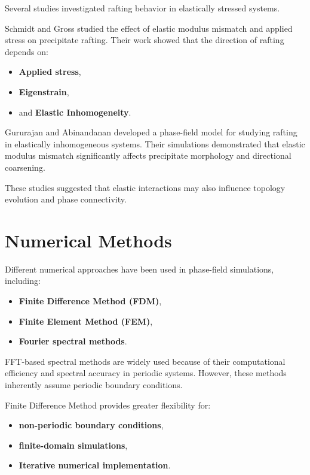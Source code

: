 Several studies investigated rafting behavior in elastically stressed systems.

Schmidt and Gross studied the effect of elastic modulus mismatch and applied stress on precipitate rafting. Their work showed that the direction of rafting depends on:

\begin{itemize}
	\item \textbf{Applied stress},
	\item \textbf{Eigenstrain},
	\item and \textbf{Elastic Inhomogeneity}.
\end{itemize}

Gururajan and Abinandanan developed a phase-field model for studying rafting in elastically inhomogeneous systems. Their simulations demonstrated that elastic modulus mismatch significantly affects precipitate morphology and directional coarsening.

These studies suggested that elastic interactions may also influence topology evolution and phase connectivity.

\section{Numerical Methods}

Different numerical approaches have been used in phase-field simulations, including:

\begin{itemize}
	\item \textbf{Finite Difference Method (FDM)},
	\item \textbf{Finite Element Method (FEM)},
	\item \textbf{Fourier spectral methods}.
\end{itemize}

FFT-based spectral methods are widely used because of their computational efficiency and spectral accuracy in periodic systems. However, these methods inherently assume periodic boundary conditions.

Finite Difference Method provides greater flexibility for:

\begin{itemize}
	\item \textbf{non-periodic boundary conditions},
	\item \textbf{finite-domain simulations},
	\item \textbf{Iterative numerical implementation}.
\end{itemize}

